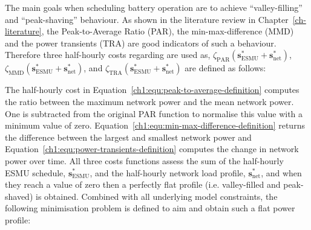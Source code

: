 The main goals when scheduling battery operation are to achieve ``valley-filling'' and ``peak-shaving'' behaviour.
As shown in the literature review in Chapter~\ref{ch-literature}, the Peak-to-Average Ratio (PAR), the min-max-difference (MMD) and the power transients (TRA) are good indicators of such a behaviour.
Therefore three half-hourly costs regarding are used as, $\zeta_\text{PAR}(\textbf{s}^*_\text{ESMU} + \textbf{s}^*_\text{net})$, $\zeta_\text{MMD}(\textbf{s}^*_\text{ESMU} + \textbf{s}^*_\text{net})$, and $\zeta_\text{TRA}(\textbf{s}^*_\text{ESMU} + \textbf{s}^*_\text{net})$ are defined as follows:








The half-hourly cost in Equation~\ref{ch1:equ:peak-to-average-definition} computes the ratio between the maximum network power and the mean network power.
One is subtracted from the original PAR function to normalise this value with a minimum value of zero.
Equation~\ref{ch1:equ:min-max-difference-definition} returns the difference between the largest and smallest network power and Equation~\ref{ch1:equ:power-transients-definition} computes the change in network power over time.
All three costs functions assess the sum of the half-hourly ESMU schedule, $\textbf{s}^*_\text{ESMU}$, and the half-hourly network load profile, $\textbf{s}^*_\text{net}$, and when they reach a value of zero then a perfectly flat profile (i.e. valley-filled and peak-shaved) is obtained.
Combined with all underlying model constraints, the following minimisation problem is defined to aim and obtain such a flat power profile:




